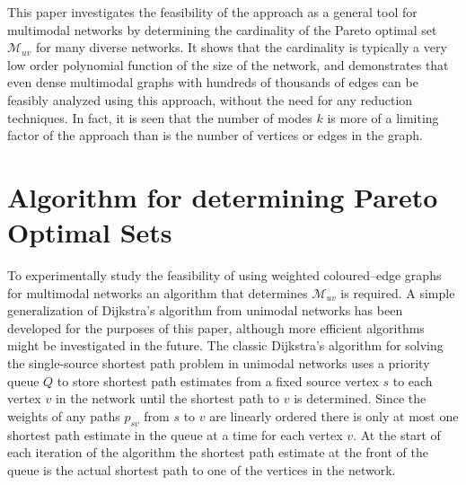 \documentclass[preprint,authoryear,12pt]{elsarticle}
\begin{document}
This paper investigates the feasibility of the approach as a general tool for
multimodal networks by determining the cardinality of the Pareto optimal set
$\mathcal{M}_{uv}$ for many diverse networks.
It shows that the cardinality is typically a very low order polynomial function
of the size of the network, and demonstrates that even dense multimodal graphs
with hundreds of thousands of edges can be feasibly analyzed using this approach,
without the need for any reduction techniques.
In fact, it is seen that the number of modes $k$ is more of a limiting
factor of the approach than is the number of vertices or edges in the graph.

\section{Algorithm for determining Pareto Optimal Sets}\label{Se:Algorithm}

To experimentally study the feasibility of using weighted coloured--edge graphs
for multimodal networks an algorithm that determines $\mathcal{M}_{uv}$
is required.
A simple generalization of Dijkstra's algorithm from unimodal networks
has been developed for the purposes of this paper,
although more efficient algorithms might be investigated in the future.
The classic Dijkstra's algorithm for solving the single-source shortest
path problem in unimodal networks uses a priority queue $Q$ to store
shortest path estimates from a fixed source vertex $s$ to each vertex $v$
in the network until the shortest path to $v$ is determined.
Since the weights of any paths $p_{sv}$ from $s$ to $v$ are linearly ordered
there is only at most one shortest path estimate in the queue at a time for each
vertex $v$.
At the start of each iteration of the algorithm the shortest path estimate
at the front of the queue is the actual shortest path to one of the vertices
in the network.
\end{document}
